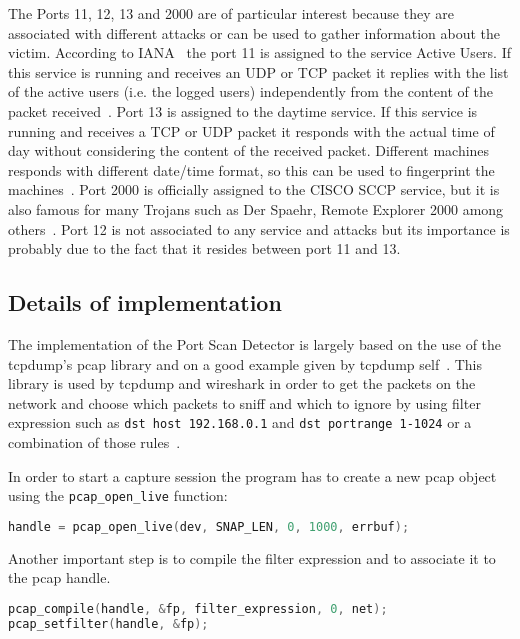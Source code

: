 The Ports 11, 12, 13 and 2000 are of particular interest because they are associated with different attacks or can be used
to gather information about the victim.
According to IANA~\cite{IANAPORTS} the port 11 is assigned to the service Active Users. If this service is running and
receives an UDP or TCP packet it replies with the list of the active users (i.e. the logged users) independently from the
content of the packet received~\cite{systat}.
Port 13 is assigned to the daytime service. If this service is running and receives a TCP or UDP packet it responds with the actual time of day without considering
the content of the received packet. Different machines responds with different date/time format, so this can be used to fingerprint the machines~\cite{portDetails}.
Port 2000 is officially assigned to the CISCO SCCP service, but it is also famous for 
many Trojans such as Der Spaehr, Remote Explorer 2000 among others~\cite{portDetails}.
Port 12 is not associated to any service and attacks but its importance is probably due to the fact that it resides between port 11 and 13.




\subsection{Details of implementation}
The implementation of the Port Scan Detector is largely based on the use of the tcpdump's pcap library
and on a good example given by tcpdump self~\cite{pcaptcpdump}.
This library is used by tcpdump and wireshark in order to get  the packets on the network and choose 
which packets to sniff and which to ignore by using filter expression such as \lstinline!dst host 192.168.0.1! and \lstinline!dst portrange 1-1024!
or a combination of those rules~\cite{pcapFilterRules}.



In order to start a capture session the program has to create a new pcap object using the \lstinline!pcap_open_live! function:
\begin{lstlisting}[frame= single, language=C, caption={Create a new pcap handler.}, label=lst:open_live]
handle = pcap_open_live(dev, SNAP_LEN, 0, 1000, errbuf);
\end{lstlisting}
Another important step is to compile the filter expression and to associate it to the pcap handle.
\begin{lstlisting}[frame= single, language=C, caption=Pcap functions called to compile the filter expression and to set it.]
pcap_compile(handle, &fp, filter_expression, 0, net);
pcap_setfilter(handle, &fp);
\end{lstlisting}



